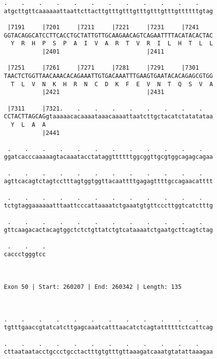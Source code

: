 \documentclass{article}
\begin{document}
\begin{Verbatim}
.    .    .    .    .    .    .    .    .    .    .    .    
atgcttgttcaaaaaattaattcttacttgtttgtttgtttgtttgtttgttttttgtag
                                                            
 |7191     |7201     |7211     |7221     |7231     |7241    
GGTACAGGCATCCTTCACCTGCTATTGTTGCAAGAACAGTCAGAATTTTACATACACTAC
  Y  R  H  P  S  P  A  I  V  A  R  T  V  R  I  L  H  T  L  L
           |2401                         |2411              
  
 |7251     |7261     |7271     |7281     |7291     |7301    
TAACTCTGGTTAACAAACACAGAAATTGTGACAAATTTGAAGTGAATACACAGAGCGTGG
  T  L  V  N  K  H  R  N  C  D  K  F  E  V  N  T  Q  S  V  A
           |2421                         |2431              
  
 |7311     |7321.    .    .    .    .    .    .    .    .   
CCTACTTAGCAGgtaaaaacacaaaataaacaaaattaatcttgctacatctatatataa
  Y  L  A  A                                                
           |2441                                            
  
 .    .    .    .    .    .    .    .    .    .    .    .   
ggatcacccaaaaagtacaaatacctataggttttttggcggttgcgtggcagagcagaa
                                                            
 .    .    .    .    .    .    .    .    .    .    .    .   
agttcacagtctagtcctttagtggtggttacaattttgagagttttgccagaacatttt
                                                            
 .    .    .    .    .    .    .    .    .    .    .    .   
tctgtaggaaaaaatttaattcccattaaaatctgaaatgtgttcccttggtcatctttg
                                                            
 .    .    .    .    .    .    .    .    .    .    .    .   
gttcaagacactacagtggctctctgttatctgtcataaaatctgaatgcttcagtctag
                                                            
 .    .    .
caccctgggtcc
            
            
 
Exon 50 | Start: 260207 | End: 260342 | Length: 135



.    .    .    .    .    .    .    .    .    .    .    .    
tgtttgaaccgtatcatcttgagcaaatcatttaacatctcagtattttttctcattcag
                                                            
.    .    .    .    .    .    .    .    .    .    .    .    
cttaataatacctgccctgcctactttgtgtttgttaaagatcaaatgtatattaaagaa
                                                            

\end{Verbatim}
\end{document}
